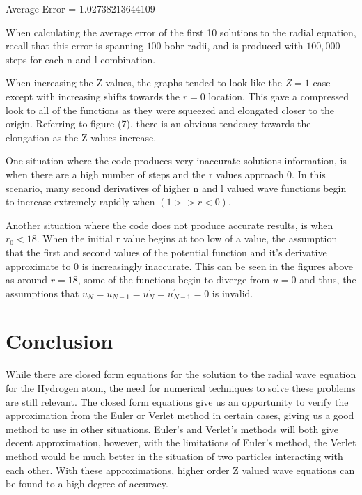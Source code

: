 \documentclass{article}
\begin{document}
\normalsize{
\begin{center}
\vspace{-0.4in}
Average Error = 1.02738213644109
\end{center}
}

\begin{multicols}{2}
\normalsize{
When calculating the average error of the first 10 solutions to the radial equation, recall that this error is spanning $100$ bohr radii, and is produced with $100,000$ steps for each n and l combination.

When increasing the Z values, the graphs tended to look like the $Z=1$ case except with increasing shifts towards the $r=0$ location. This gave a compressed look to all of the functions as they were squeezed and elongated closer to the origin. Referring to figure (7), there is an obvious tendency towards the elongation as the Z values increase.

One situation where the code produces very inaccurate solutions information, is when there are a high number of steps and the r values approach $0$. In this scenario, many second derivatives of higher n and l valued wave functions begin to increase extremely rapidly when $(1 >> r < 0)$. 

Another situation where the code does not produce accurate results, is when $r_0 < 18$. When the initial r value begins at too low of a value, the assumption that the first and second values of the potential function and it's derivative approximate to $0$ is increasingly inaccurate. This can be seen in the figures above as around $r=18$, some of the functions begin to diverge from $u=0$ and thus, the assumptions that $u_N=u_{N-1}=u^{\prime}_N=u^{\prime}_{N-1}=0$ is invalid.
}

\section{Conclusion}
While there are closed form equations for the solution to the radial wave equation for the Hydrogen atom, the need for numerical techniques to solve these problems are still relevant. The closed form equations give us an opportunity to verify the approximation from the Euler or Verlet method in certain cases, giving us a good method to use in other situations. Euler's and Verlet's methods will both give decent approximation, however, with the limitations of Euler's method, the Verlet method would be much better in the situation of two particles interacting with each other. With these approximations, higher order Z valued wave equations can be found to a high degree of accuracy.
\end{multicols}
\end{document}
